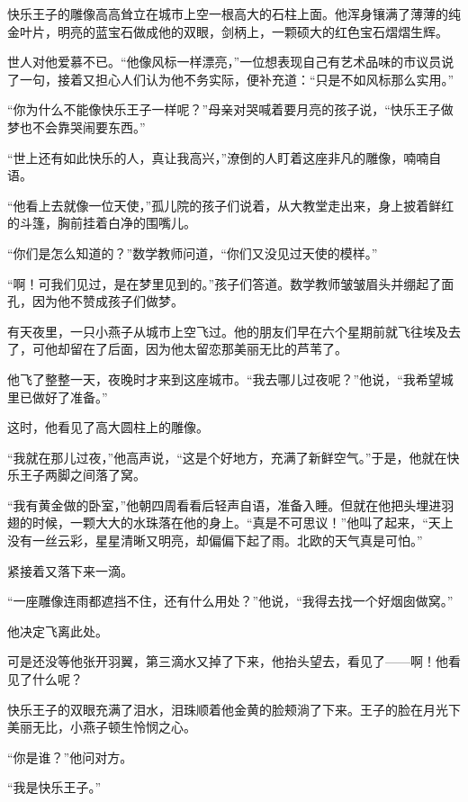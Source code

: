\documentclass[12pt,UTF-8,openany]{ctexbook}
\begin{document}
\begin{normalsize}
    
    快乐王子的雕像高高耸立在城市上空一根高大的石柱上面。他浑身镶满了薄薄的纯金叶片，明亮的蓝宝石做成他的双眼，剑柄上，一颗硕大的红色宝石熠熠生辉。
    
    世人对他爱慕不已。“他像风标一样漂亮，”一位想表现自己有艺术品味的市议员说了一句，接着又担心人们认为他不务实际，便补充道：“只是不如风标那么实用。”
    
    “你为什么不能像快乐王子一样呢？”母亲对哭喊着要月亮的孩子说，“快乐王子做梦也不会靠哭闹要东西。”
    
    “世上还有如此快乐的人，真让我高兴，”潦倒的人盯着这座非凡的雕像，喃喃自语。
    
    “他看上去就像一位天使，”孤儿院的孩子们说着，从大教堂走出来，身上披着鲜红的斗篷，胸前挂着白净的围嘴儿。
    
    “你们是怎么知道的？”数学教师问道，“你们又没见过天使的模样。”
    
    “啊！可我们见过，是在梦里见到的。”孩子们答道。数学教师皱皱眉头并绷起了面孔，因为他不赞成孩子们做梦。
    
    有天夜里，一只小燕子从城市上空飞过。他的朋友们早在六个星期前就飞往埃及去了，可他却留在了后面，因为他太留恋那美丽无比的芦苇了。
    
    他飞了整整一天，夜晚时才来到这座城市。“我去哪儿过夜呢？”他说，“我希望城里已做好了准备。”
    
    这时，他看见了高大圆柱上的雕像。
    
    “我就在那儿过夜，”他高声说，“这是个好地方，充满了新鲜空气。”于是，他就在快乐王子两脚之间落了窝。
    
    “我有黄金做的卧室，”他朝四周看看后轻声自语，准备入睡。但就在他把头埋进羽翅的时候，一颗大大的水珠落在他的身上。“真是不可思议！”他叫了起来，“天上没有一丝云彩，星星清晰又明亮，却偏偏下起了雨。北欧的天气真是可怕。”
    
    紧接着又落下来一滴。
    
    “一座雕像连雨都遮挡不住，还有什么用处？”他说，“我得去找一个好烟囱做窝。”
    
    他决定飞离此处。
    
    可是还没等他张开羽翼，第三滴水又掉了下来，他抬头望去，看见了——啊！他看见了什么呢？
    
    快乐王子的双眼充满了泪水，泪珠顺着他金黄的脸颊淌了下来。王子的脸在月光下美丽无比，小燕子顿生怜悯之心。
    
    “你是谁？”他问对方。
    
    “我是快乐王子。”
    

\end{normalsize}
\end{document}
